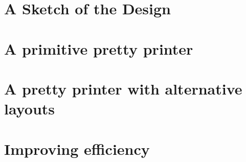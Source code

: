\section{A Sketch of the Design}




\section{A primitive pretty printer}




\section{A pretty printer with alternative layouts}




\section{Improving efficiency}




